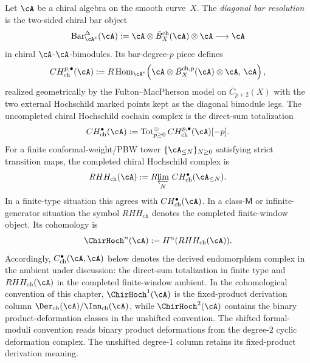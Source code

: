 \begin{definition}
\label{def:diagonal-bar-rhh-chiral}
Let $\cA$ be a chiral algebra on the smooth curve~$X$.  The
\emph{diagonal bar resolution} is the two-sided chiral bar object
\[
\operatorname{Bar}_{\cA^e}^{\Delta}(\cA)
:=
\cA\otimes \bar B^{\mathrm{ch}}_X(\cA)\otimes \cA
\longrightarrow \cA
\]
in chiral $\cA$-$\cA$-bimodules. Its bar-degree-$p$ piece defines
\[
CH^{p,\bullet}_{\mathrm{ch}}(\cA)
:=
R\operatorname{Hom}_{\cA^e}
\!\left(
\cA\otimes \bar B^{\mathrm{ch},p}_X(\cA)\otimes\cA,\,
\cA
\right),
\]
realized geometrically by the Fulton--MacPherson model on
$\overline C_{p+2}(X)$ with the two external Hochschild marked points
kept as the diagonal bimodule legs. The uncompleted chiral
Hochschild cochain complex is the direct-sum totalization
\[
CH^\bullet_{\mathrm{ch}}(\cA)
:=
\operatorname{Tot}^{\oplus}_{p\ge0}
CH^{p,\bullet}_{\mathrm{ch}}(\cA)[-p].
\]
For a finite conformal-weight/PBW tower
$\{\cA_{\leq N}\}_{N\ge0}$ satisfying strict transition maps, the
completed chiral Hochschild complex is
\[
RHH_{\mathrm{ch}}(\cA)
:=
R\!\varprojlim_N\,
CH^\bullet_{\mathrm{ch}}(\cA_{\leq N}).
\]
In a finite-type situation this agrees with
$CH^\bullet_{\mathrm{ch}}(\cA)$. In a class-\(\mathsf M\) or
infinite-generator situation the symbol $RHH_{\mathrm{ch}}$ denotes
the completed finite-window object. Its cohomology is
\[
\ChirHoch^n(\cA):=H^n(RHH_{\mathrm{ch}}(\cA)).
\]
Accordingly, $C^\bullet_{\mathrm{ch}}(\cA,\cA)$ below denotes the
derived endomorphism complex in the ambient under discussion: the
direct-sum totalization in finite type and $RHH_{\mathrm{ch}}(\cA)$
in the completed finite-window ambient.
In the cohomological convention of this chapter,
$\ChirHoch^1(\cA)$ is the fixed-product derivation column
$\Der_{\mathrm{ch}}(\cA)/\Inn_{\mathrm{ch}}(\cA)$, while
$\ChirHoch^2(\cA)$ contains the binary product-deformation classes in
the unshifted convention.
The shifted formal-moduli convention reads binary product
deformations from the degree-$2$ cyclic deformation complex.  The
unshifted degree-$1$ column retains its fixed-product derivation
meaning.
\end{definition}

